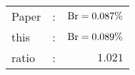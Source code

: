       \begin{tabular}{lcr}
          Paper &:& $\mathrm{Br}  = 0.087\%$ \\
          this      &:& $\mathrm{Br}  = 0.089\%$ \\
		  ratio   &:& $1.021$ \\
      \end{tabular}
